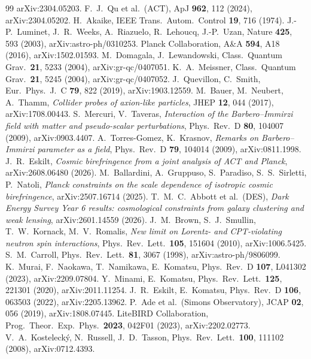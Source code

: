 \documentclass[11pt]{article}
\begin{document}
\begin{thebibliography}{99}
  arXiv:2304.05203.
 F.~J.~Qu et al.\ (ACT), ApJ \textbf{962}, 112 (2024), arXiv:2304.05202.
 H.~Akaike, IEEE Trans.\ Autom.\ Control \textbf{19}, 716 (1974).
 J.-P.~Luminet, J.~R.~Weeks, A.~Riazuelo, R.~Lehoucq, J.-P.~Uzan,
  Nature \textbf{425}, 593 (2003), arXiv:astro-ph/0310253.
 Planck Collaboration, A\&A \textbf{594}, A18 (2016), arXiv:1502.01593.
 M.~Domagala, J.~Lewandowski, Class.\ Quantum Grav.\ \textbf{21}, 5233
  (2004), arXiv:gr-qc/0407051.
 K.~A.~Meissner, Class.\ Quantum Grav.\ \textbf{21}, 5245 (2004),
  arXiv:gr-qc/0407052.
 J.~Quevillon, C.~Smith, Eur.\ Phys.\ J.\ C \textbf{79}, 822 (2019),
  arXiv:1903.12559.
 M.~Bauer, M.~Neubert, A.~Thamm, \emph{Collider probes of axion-like particles}, JHEP
  \textbf{12}, 044 (2017), arXiv:1708.00443.
 S.~Mercuri, V.~Taveras, \emph{Interaction of the Barbero--Immirzi field with matter and
  pseudo-scalar perturbations}, Phys.\ Rev.\ D \textbf{80}, 104007 (2009), arXiv:0903.4407.
 A.~Torres-Gomez, K.~Krasnov, \emph{Remarks on Barbero--Immirzi parameter as a field},
  Phys.\ Rev.\ D \textbf{79}, 104014 (2009), arXiv:0811.1998.
 J.~R.~Eskilt, \emph{Cosmic birefringence from a joint analysis of ACT and Planck},
  arXiv:2608.06480 (2026).
 M.~Ballardini, A.~Gruppuso, S.~Paradiso, S.~S.~Sirletti, P.~Natoli, \emph{Planck
  constraints on the scale dependence of isotropic cosmic birefringence}, arXiv:2507.16714 (2025).
 T.~M.~C.~Abbott et al.\ (DES), \emph{Dark Energy Survey Year 6 results: cosmological constraints
  from galaxy clustering and weak lensing}, arXiv:2601.14559 (2026).
 J.~M.~Brown, S.~J.~Smullin, T.~W.~Kornack, M.~V.~Romalis, \emph{New limit on Lorentz- and
  CPT-violating neutron spin interactions}, Phys.\ Rev.\ Lett.\ \textbf{105}, 151604 (2010), arXiv:1006.5425.
 S.~M.~Carroll, Phys.\ Rev.\ Lett.\ \textbf{81}, 3067 (1998),
  arXiv:astro-ph/9806099.
 K.~Murai, F.~Naokawa, T.~Namikawa, E.~Komatsu, Phys.\ Rev.\ D
  \textbf{107}, L041302 (2023), arXiv:2209.07804.
 Y.~Minami, E.~Komatsu, Phys.\ Rev.\ Lett.\ \textbf{125}, 221301 (2020),
  arXiv:2011.11254.
 J.~R.~Eskilt, E.~Komatsu, Phys.\ Rev.\ D \textbf{106}, 063503 (2022),
  arXiv:2205.13962.
 P.~Ade et al.\ (Simons Observatory), JCAP \textbf{02}, 056 (2019),
  arXiv:1808.07445.
 LiteBIRD Collaboration, Prog.\ Theor.\ Exp.\ Phys.\ \textbf{2023},
  042F01 (2023), arXiv:2202.02773.
 V.~A.~Kosteleck\'y, N.~Russell, J.~D.~Tasson, Phys.\ Rev.\ Lett.\
  \textbf{100}, 111102 (2008), arXiv:0712.4393.
\end{thebibliography}
\end{document}
